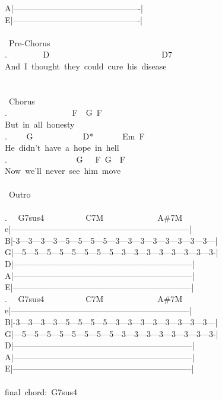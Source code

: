 {A|----------------------------------------------|\\
E|----------------------------------------------|\\
\\
\lbrack\ Pre-Chorus\rbrack\\
. \ \ \ \ \ \ \ \ D\ \ \ \ \ \ \ \ \ \ \ \ \ \ \ \ \ \ \ \ \ \ \ \ \ \ \ D7\\
And\ I\ thought\ they\ could\ cure\ his\ disease\\
\\
\\
\lbrack\ Chorus\rbrack\\
. \ \ \ \ \ \ \ \ \ \ \ \ \ \ \ F\ \ G\ F\\
But\ in\ all\ honesty\\
. \ \ \ \ G\ \ \ \ \ \ \ \ \ \ \ \ D*\ \ \ \ \ \ \ Em\ F\\
He\ didn't\ have\ a\ hope\ in\ hell\\
. \ \ \ \ \ \ \ \ \ \ \ \ \ \ \ \ G\ \ \ F\ G\ \ F\\
Now\ we'll\ never\ see\ him\ move\\
\\
\lbrack\ Outro\rbrack\\
\\
. \ \ G7sus4\ \ \ \ \ \ \ \ \ \ C7M\ \ \ \ \ \ \ \ \ \ \ \ \ A\#7M\\
e|-----------------------------------------------------------------|\\
B|-3---3---3---3---5---5---5---5---3---3---3---3---3---3---3---3---|\\
G|---5---5---5---5---5---5---5---5---3---3---3---3---3---3---3---3-|\\
D|-----------------------------------------------------------------|\\
A|-----------------------------------------------------------------|\\
E|-----------------------------------------------------------------|\\
. \ \ G7sus4\ \ \ \ \ \ \ \ \ \ C7M\ \ \ \ \ \ \ \ \ \ \ \ \ A\#7M\\
e|-----------------------------------------------------------------|\\
B|-3---3---3---3---5---5---5---5---3---3---3---3---3---3---3---3---|\\
G|---5---5---5---5---5---5---5---5---3---3---3---3---3---3---3---3-|\\
D|-----------------------------------------------------------------|\\
A|-----------------------------------------------------------------|\\
E|-----------------------------------------------------------------|\\
\\
final\ chord:\ G7sus4\ }
